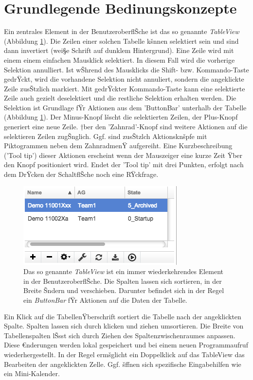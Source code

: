 \documentclass[11pt,oneside]{scrbook}
\begin{document}
\section{Grundlegende Bedinungskonzepte}
\label{ui-concepts}
Ein zentrales Element in der BenutzeroberflŠche ist das so genannte {\it TableView} (Abbildung \ref{fig:tableView}). Die Zeilen einer solchen Tabelle kšnnen selektiert sein und sind dann invertiert (wei§e Schrift auf dunklem Hintergrund). Eine Zeile wird mit einem einem einfachen Mausklick selektiert. In diesem Fall wird die vorherige Selektion annulliert. Ist wŠhrend des Mausklicks die Shift- bzw. Kommando-Taste gedrŸckt, wird die  vorhandene Selektion nicht annuliert, sondern die angeklickte Zeile zusŠtzlich markiert. Mit gedrŸckter Kommando-Taste kann eine selektierte Zeile auch gezielt deselektiert und die restliche Selektion  erhalten werden. Die Selektion ist Grundlage fŸr Aktionen aus dem 'ButtonBar' unterhalb der Tabelle (Abbildung \ref{fig:tableView}). Der Minus-Knopf lšscht die selektierten Zeilen, der Plus-Knopf generiert eine neue Zeile. †ber den 'Zahnrad'-Knopf sind weitere Aktionen auf die selektieren Zeilen zugŠnglich. Ggf. sind zusŠtzlch Aktionsknšpfe mit Piktogrammen neben dem ZahnradmenŸ aufgereiht. Eine Kurzbeschreibung ('Tool tip') dieser Aktionen erscheint wenn der Mauszeiger eine kurze Zeit Ÿber den Knopf positioniert wird. Endet der 'Tool tip' mit drei Punkten, erfolgt nach dem DrŸcken der SchaltflŠche noch eine RŸckfrage.

\begin{figure}[htbp]
\begin{center}
\includegraphics[scale=0.8]{figs/tableview.png}
\caption{Das so genannte {\it TableView} ist ein immer wiederkehrendes Element in der BenutzeroberflŠche. Die Spalten lassen sich sortieren, in der Breite Šndern und verschieben. Darunter befindet sich in der Regel ein {\it ButtonBar} fŸr Aktionen auf die Daten der Tabelle.}
\label{fig:tableView}
\end{center}
\end{figure}

Ein Klick auf die TabellenŸberschrift sortiert die Tabelle nach der angeklickten Spalte. Spalten lassen sich durch klicken und ziehen umsortieren. Die Breite von Tabellenspalten lŠsst sich durch Ziehen des Spaltenzwischenraumes anpassen. Diese €nderungen werden lokal gespeichert und bei einem neuen Programmaufruf wiederhergestellt.
In der Regel ermšglicht ein Doppelklick auf das TableView das Bearbeiten der angeklickten Zelle. Ggf. šffnen sich spezifische Eingabehilfen wie ein Mini-Kalender.
\end{document}
